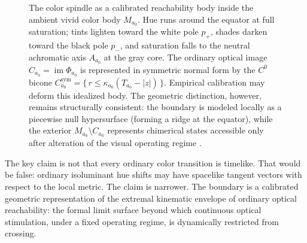 \documentclass[preprint,12pt,authoryear]{elsarticle}
\theoremstyle{plain}
\theoremstyle{definition}
\theoremstyle{remark}
\begin{document}
\begin{figure}[t]
\caption{The color spindle as a calibrated reachability body inside the
ambient vivid color body $M_{a_0}$. Hue runs around the equator at full
saturation; tints lighten toward the white pole $p_+$, shades darken
toward the black pole $p_-$, and saturation falls to the neutral
achromatic axis $A_{a_0}$ at the gray core. The ordinary optical image
$C_{a_0}=\operatorname{im}\Phi_{a_0}$ is represented in symmetric normal
form by the $C^0$ bicone
$C_{a_0}^{\mathrm{sym}}=\{\,r\le\kappa_{a_0}(T_{a_0}-|z|)\,\}$.
Empirical calibration may deform this idealized body. The geometric
distinction, however, remains structurally consistent: the boundary is
modeled locally as a piecewise null hypersurface (forming a ridge at the
equator), while the exterior $M_{a_0}\setminus C_{a_0}$ represents
chimerical states accessible only after alteration of the visual operating
regime \citep{Churchland2005}.}
\label{fig:spindle}
\end{figure}

The key claim is not that every ordinary color transition is timelike. That would be false: ordinary isoluminant hue shifts may have spacelike tangent vectors with respect to the local metric. The claim is narrower. The boundary is a calibrated geometric representation of the extremal kinematic envelope of ordinary optical reachability: the formal limit surface beyond which continuous optical stimulation, under a fixed operating regime, is dynamically restricted from crossing.
\end{document}
